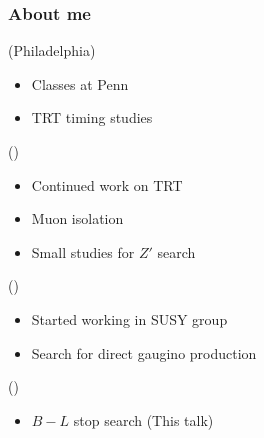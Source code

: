 \documentclass[10pt, svgnames]{beamer}
\begin{document}
\begin{frame}
  \frametitle{About me}
  \begin{description}[0ex]
    \item[2008-2010] (Philadelphia) \\
      \begin{itemize}
        \item Classes at Penn
        \item TRT timing studies
      \end{itemize}
    \item[2010-2012] (\cern) \\
      \begin{itemize}
        \item Continued work on TRT
        \item Muon isolation
        \item Small studies for $Z'$ search
      \end{itemize}
    \item[2012-2013] (\cern) \\
      \begin{itemize}
        \item Started working in SUSY group
        \item Search for direct gaugino production
      \end{itemize}
    \item[2013-2015] (\cern) \\
      \begin{itemize}
        \item $B-L$ stop search (This talk)
      \end{itemize}
  \end{description}
\end{frame}
\end{document}
